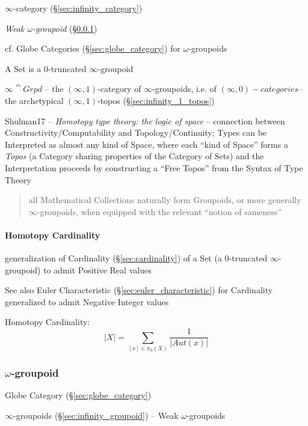 \fist $\infty$-category (\S\ref{sec:infinity_category})

\emph{Weak $\omega$-groupoid} (\S\ref{sec:omega_groupoid})

\fist cf. Globe Categories (\S\ref{sec:globe_category}) for
$\omega$-groupoids

A Set is a $0$-truncated $\infty$-groupoid %

$\infty\cat{Grpd}$ -- the $(\infty,1)$-category of $\infty$-groupoids,
i.e. of $(\infty,0)-categories$-- the archetypical
$(\infty,1)$-topos (\S\ref{sec:infinity_1_topos})

Shulman17 -- \emph{Homotopy type theory: the logic of space} --
connection between Constructivity/Computability and Topology/Continuity; Types
can be Interpreted as almost any kind of Space, where each ``kind of Space''
forms a \emph{Topos} (a Category sharing properties of the Category of Sets) and
the Interpretation proceeds by constructing a ``Free Topos'' from the Syntax of
Type Theory
\begin{quote}
all Mathematical Collections naturally form Groupoids, or more
generally $\infty$-groupoids, when equipped with the relevant ``notion
of sameness''
\end{quote}



\paragraph{Homotopy Cardinality}\label{sec:homotopy_cardinality}\hfill

generalization of Cardinality (\S\ref{sec:cardinality}) of a Set (a
$0$-truncated $\infty$-groupoid) to admit Positive Real values

\fist See also Euler Characteristic (\S\ref{sec:euler_characteristic})
for Cardinality generalized to admit Negative Integer values

Homotopy Cardinality:
\[
  |X| = \sum_{[x] \in \pi_0(X)} \frac{1}{|Aut(x)|}
\] %



\subsubsection{$\omega$-groupoid}\label{sec:omega_groupoid}

Globe Category (\S\ref{sec:globe_category})

$\infty$-groupoids (\S\ref{sec:infinity_groupoid}) -- Weak
$\omega$-groupoids

